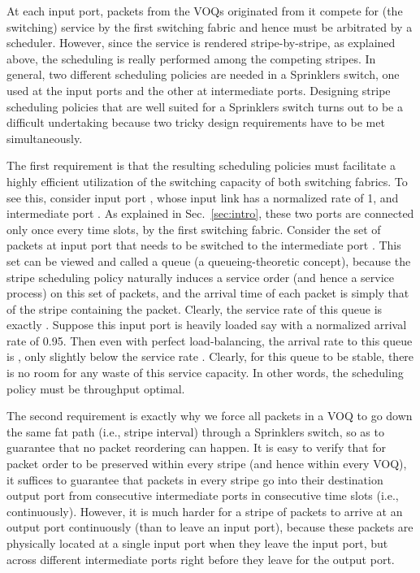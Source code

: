 At each input port, packets from the  VOQs originated from it compete for (the switching) service by the first switching fabric
and hence must be arbitrated by a scheduler.   However, since the service is rendered stripe-by-stripe, as explained above, the scheduling
is really performed among the competing stripes.  In general, two different scheduling policies are needed in a Sprinklers switch, one used
at the input ports and the other at intermediate ports.  
Designing stripe scheduling policies that are well suited for a Sprinklers switch 
turns out to be a difficult undertaking because two tricky design requirements have to be met simultaneously.  

The first requirement is that the resulting scheduling policies must facilitate a highly efficient utilization of the switching capacity of both switching fabrics.
To see this, consider input port , whose input link has a normalized rate of 1, and intermediate port .  
As explained in 
Sec.~\ref{sec:intro}, these two ports are connected only once every  time slots, by the first switching fabric.  
Consider the set of packets at input port  that needs to be switched to the intermediate port .  
This set can be viewed and called a queue (a queueing-theoretic concept), because 
the stripe scheduling policy naturally induces a service order (and hence a service process)
on this set of packets, and the arrival time of each packet is simply that of the stripe containing the packet.
Clearly, the service rate of this queue is exactly .  Suppose this input port is heavily loaded 
say with a normalized arrival rate of 0.95.  Then even with perfect load-balancing, the arrival rate to this queue is , only slightly below the service rate .  
Clearly, for this queue to be stable,
there is no room for any waste of this service capacity.
In other words, the scheduling policy must be throughput optimal.

The second requirement is exactly why we force all packets in a VOQ to go down the same fat path (i.e., stripe interval) 
through a Sprinklers switch, so as to guarantee that no packet reordering
can happen.  
It is 
easy to verify
that for packet order to be preserved within every stripe (and hence within every VOQ),
it suffices to guarantee that packets in every stripe go into their destination output port from
consecutive intermediate ports in consecutive time slots (i.e., continuously).  However, it is much harder for a stripe of  packets to arrive at an output port continuously (than to leave an input port),
because these packets are physically located at a single input port when they leave the input port, but 
across  different intermediate
ports right before they leave for the output port.  

